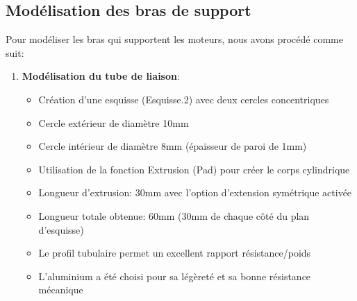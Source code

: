 \documentclass[a4paper,12pt]{report}
\begin{document}
\subsection{Modélisation des bras de support}
Pour modéliser les bras qui supportent les moteurs, nous avons procédé comme suit:
\begin{enumerate}
    \item \textbf{Modélisation du tube de liaison}:
    \begin{itemize}
        \item Création d'une esquisse (Esquisse.2) avec deux cercles concentriques
        \item Cercle extérieur de diamètre 10mm
        \item Cercle intérieur de diamètre 8mm (épaisseur de paroi de 1mm)
        \item Utilisation de la fonction Extrusion (Pad) pour créer le corps cylindrique
        \item Longueur d'extrusion: 30mm avec l'option d'extension symétrique activée
        \item Longueur totale obtenue: 60mm (30mm de chaque côté du plan d'esquisse)
        \item Le profil tubulaire permet un excellent rapport résistance/poids
        \item L'aluminium a été choisi pour sa légèreté et sa bonne résistance mécanique
    \end{itemize}
    

\end{enumerate}
\end{document}
